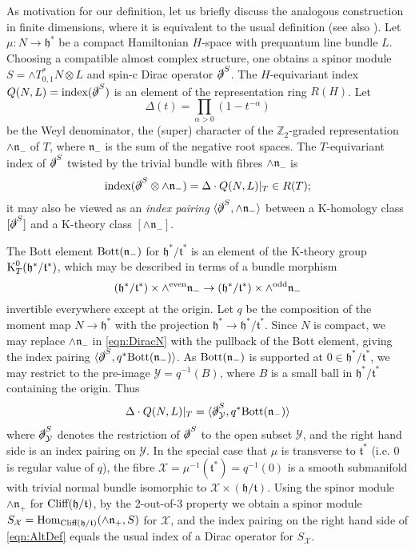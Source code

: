 \documentclass[11pt,reqno]{amsart}
\theoremstyle{definition}
\theoremstyle{remark}
\newcommand{\pair}[2]{\langle #1, #2 \rangle}
\newcommand{\tn}[1]{\textnormal{#1}}
\def\t{\ensuremath{\mathfrak{t}}}
\def\h{\ensuremath{\mathfrak{h}}}
\def\n{\ensuremath{\mathfrak{n}}}
\def\Y{\ensuremath{\mathcal{Y}}}
\def\K{\ensuremath{\mathcal{K}}}
\def\X{\ensuremath{\mathcal{X}}}
\def\dirac{\ensuremath{\slashed{\partial}}} %
\def\bZ{\ensuremath{\mathbb{Z}}}
\def\Hom{\ensuremath{\textnormal{Hom}}}
\def\Cliff{\ensuremath{\textnormal{Cliff}}}
\def\index{\ensuremath{\textnormal{index}}}
\def\K{\ensuremath{\textnormal{K}}}
\def\Bott{\ensuremath{\textnormal{Bott}}}
\begin{document}
As motivation for our definition, let us briefly discuss the analogous construction in finite dimensions, where it is equivalent to the usual definition (see also \cite[Section 6]{LMSspinor}).  Let $\mu \colon N \rightarrow \h^\ast$ be a compact Hamiltonian $H$-space with prequantum line bundle $L$.  Choosing a compatible almost complex structure, one obtains a spinor module $S=\wedge T^\ast_{0,1} N \otimes L$ and spin-c Dirac operator $\dirac^S$.  The $H$-equivariant index $Q(N,L)=\index(\dirac^S)$ is an element of the representation ring $R(H)$.  Let
\[ \Delta(t)=\prod_{\alpha>0} (1-t^{-\alpha}) \]
be the Weyl denominator, the (super) character of the $\bZ_2$-graded representation $\wedge \n_-$ of $T$, where $\n_-$ is the sum of the negative root spaces.  The $T$-equivariant index of $\dirac^S$ twisted by the trivial bundle with fibres $\wedge \n_-$ is
\begin{equation} 
\label{eqn:DiracN}
\index(\dirac^S\otimes \wedge \n_-)=\Delta \cdot Q(N,L)|_T \in R(T);
\end{equation}
it may also be viewed as an \emph{index pairing} $\pair{\dirac^S}{\wedge \n_-}$ between a K-homology class $[\dirac^S]$ and a K-theory class $[\wedge \n_-]$.

The Bott element $\Bott(\n_-)$ for $\h^\ast/\t^\ast$ is an element of the K-theory group $\K^0_T(\h^\ast/\t^\ast)$, which may be described in terms of a bundle morphism
\[ (\h^\ast/\t^\ast) \times \wedge^{\tn{even}} \n_- \rightarrow (\h^\ast/\t^\ast) \times \wedge^{\tn{odd}} \n_-\]
invertible everywhere except at the origin.  Let $q$ be the composition of the moment map $N \rightarrow \h^\ast$ with the projection $\h^\ast \rightarrow \h^\ast/\t^\ast$.  Since $N$ is compact, we may replace $\wedge \n_-$ in \eqref{eqn:DiracN} with the pullback of the Bott element, giving the index pairing $\pair{\dirac^S}{q^\ast\Bott(\n_-)}$.  As $\Bott(\n_-)$ is supported at $0 \in \h^\ast/\t^\ast$, we may restrict to the pre-image $\Y=q^{-1}(B)$, where $B$ is a small ball in $\h^\ast/\t^\ast$ containing the origin.  Thus
\begin{equation} 
\label{eqn:AltDef}
\Delta \cdot Q(N,L)|_T=\pair{\dirac^S_\Y}{q^\ast \Bott(\n_-)} 
\end{equation}
where $\dirac^S_\Y$ denotes the restriction of $\dirac^S$ to the open subset $\Y$, and the right hand side is an index pairing on $\Y$.  In the special case that $\mu$ is transverse to $\t^\ast$ (i.e. $0$ is regular value of $q$), the fibre $\X=\mu^{-1}(\t^\ast)=q^{-1}(0)$ is a smooth submanifold with trivial normal bundle isomorphic to $\X \times (\h/\t)$.  Using the spinor module $\wedge \n_+$ for $\Cliff(\h/\t)$, by the 2-out-of-3 property we obtain a spinor module $S_{\X}=\Hom_{\Cliff(\h/\t)}(\wedge \n_+,S)$ for $\X$, and the index pairing on the right hand side of \eqref{eqn:AltDef} equals the usual index of a Dirac operator for $S_{\X}$.
\end{document}
